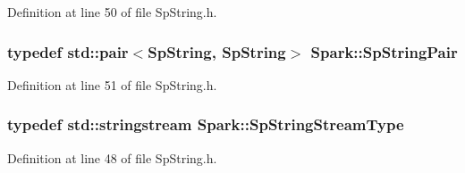 Definition at line 50 of file Sp\-String.h.
\subsubsection{\setlength{\rightskip}{0pt plus 5cm}typedef std::pair$<${\bf Sp\-String}, {\bf Sp\-String}$>$ {\bf Spark::Sp\-String\-Pair}}\label{namespaceSpark_a6}


Definition at line 51 of file Sp\-String.h.
\subsubsection{\setlength{\rightskip}{0pt plus 5cm}typedef std::stringstream {\bf Spark::Sp\-String\-Stream\-Type}}\label{namespaceSpark_a3}


Definition at line 48 of file Sp\-String.h.